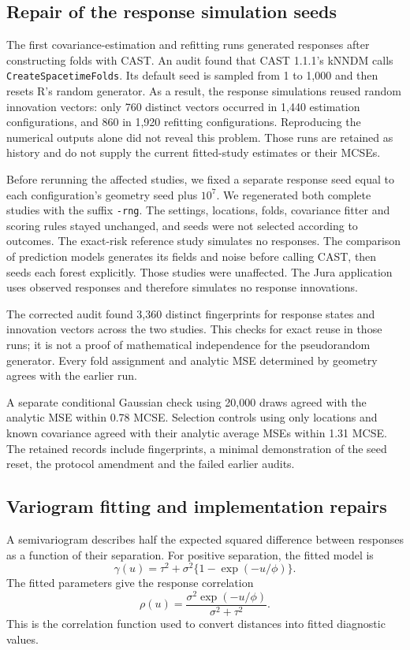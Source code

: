 \documentclass[11pt,a4paper]{article}
\begin{document}
\subsection{Repair of the response simulation seeds}
\label{sec:seeds}
The first covariance-estimation and refitting runs generated responses after constructing folds with CAST. An audit found that CAST 1.1.1's kNNDM calls \texttt{CreateSpacetimeFolds}. Its default seed is sampled from 1 to 1,000 and then resets R's random generator. As a result, the response simulations reused random innovation vectors: only 760 distinct vectors occurred in 1,440 estimation configurations, and 860 in 1,920 refitting configurations. Reproducing the numerical outputs alone did not reveal this problem. Those runs are retained as history and do not supply the current fitted-study estimates or their MCSEs.

Before rerunning the affected studies, we fixed a separate response seed equal to each configuration's geometry seed plus $10^7$. We regenerated both complete studies with the suffix \texttt{-rng}. The settings, locations, folds, covariance fitter and scoring rules stayed unchanged, and seeds were not selected according to outcomes. The exact-risk reference study simulates no responses. The comparison of prediction models generates its fields and noise before calling CAST, then seeds each forest explicitly. Those studies were unaffected. The Jura application uses observed responses and therefore simulates no response innovations.

The corrected audit found 3,360 distinct fingerprints for response states and innovation vectors across the two studies. This checks for exact reuse in those runs; it is not a proof of mathematical independence for the pseudorandom generator. Every fold assignment and analytic MSE determined by geometry agrees with the earlier run.

A separate conditional Gaussian check using 20,000 draws agreed with the analytic MSE within 0.78 MCSE. Selection controls using only locations and known covariance agreed with their analytic average MSEs within 1.31 MCSE. The retained records include fingerprints, a minimal demonstration of the seed reset, the protocol amendment and the failed earlier audits.

\subsection{Variogram fitting and implementation repairs}
\label{sec:variogram}
A semivariogram describes half the expected squared difference between responses as a function of their separation. For positive separation, the fitted model is
\[
 \gamma(u)=\tau^2+\sigma^2\{1-\exp(-u/\phi)\}.
\]
The fitted parameters give the response correlation
\[
 \rho(u)=\frac{\sigma^2\exp(-u/\phi)}{\sigma^2+\tau^2}.
\]
This is the correlation function used to convert distances into fitted diagnostic values.
\end{document}
